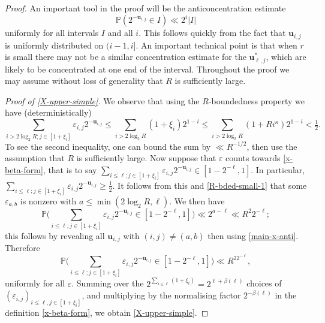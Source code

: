 \documentclass[11pt,reqno]{amsart}
\numberwithin{equation}{section}
\theoremstyle{definition}
\theoremstyle{remark}
\newcommand{\mb}{\mathbb}
\newcommand{\mbf}{\mathbf}
\newcommand{\eps}{\varepsilon}
\renewcommand{\le}{\leqslant}
\renewcommand{\ge}{\geqslant}
\begin{document}
\begin{proof} An important tool in the proof will be the anticoncentration estimate
\begin{equation}\label{main-x-anti}\mb{P}(2^{-\mbf{u}_{i,j}} \in I) \ll 2^i |I|\end{equation} uniformly for all intervals $I$ and all $i$. This follows quickly from the fact that $\mbf{u}_{i,j}$ is uniformly distributed on $(i-1,i]$. An important technical point is that when $r$ is small there may not be a similar concentration estimate for the $\mbf{u}^*_{\ell, j}$, which are likely to be concentrated at one end of the interval. Throughout the proof we may assume without loss of generality that $R$ is sufficiently large. \vspace*{8pt}

\emph{Proof of \cref{X-upper-simple}.}  We observe that using the $R$-boundedness property we have (deterministically)
\begin{equation}\label{R-bded-small-1} \sum_{i > 2\log_2 R; j \in [1 + \xi_i]} \eps_{i,j} 2^{-\mbf{u}_{i,j}} \le \sum_{i > 2 \log_2 R} ( 1+\xi_i) 2^{1-i} \le \sum_{i> 2 \log_2 R} (1 + R i^{\kappa}) 2^{1-i} < \tfrac{1}{2}.\end{equation} To see the second inequality, one can bound the sum by $\ll R^{-1/2}$, then use the assumption that $R$ is sufficiently large. Now suppose that $\eps$ counts towards \cref{x-beta-form}, that is to say $\sum_{i \le \ell;j \in [1 + \xi_i]} \eps_{i,j} 2^{-\mbf{u}_{i,j}} \in [1 - 2^{-\ell},1]$. In particular, $\sum_{i \le \ell;j \in [1 + \xi_i]} \eps_{i,j} 2^{-\mbf{u}_{i,j}} \ge \frac{1}{2}$. It follows from this and \cref{R-bded-small-1} that some $\eps_{a,b}$ is nonzero with $a \le \min(2\log_2 R,\ell)$. We then have \[ \mb{P}\big(\sum_{i \le \ell; j \in [1 + \xi_i]} \eps_{i,j} 2^{-\mbf{u}_{i,j}} \in [1 - 2^{-\ell},1]\big) \ll 2^{a- \ell} \ll R^2 2^{-\ell};\] this follows by revealing all $\mbf{u}_{i,j}$ with $(i,j) \ne (a,b)$ then using \cref{main-x-anti}. Therefore \[ \mb{P}\big(\sum_{i \le \ell; j \in [1 + \xi_i]} \eps_{i,j} 2^{-\mbf{u}_{i,j}} \in [1 - 2^{-\ell},1]\big) \ll  R^22^{-\ell},\] uniformly for all $\eps$. Summing over the $2^{\sum_{i \le \ell} (1+\xi_i)} = 2^{\ell + \beta(\ell)}$ choices of $(\eps_{i,j})_{i \le \ell, j \in [1+\xi_i]}$, and multiplying by the normalising factor $2^{-\beta(\ell)}$ in the definition \cref{x-beta-form}, we obtain \cref{X-upper-simple}.\vspace*{8pt}


\end{proof}
\end{document}
